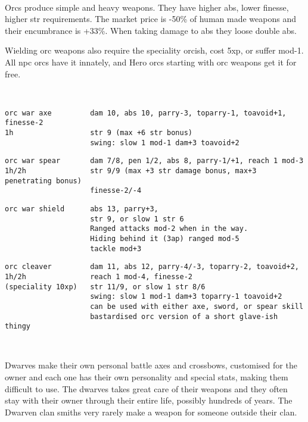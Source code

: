 \


\goodbreak
\noindent Orcs produce simple and heavy weapons. They have higher abs, lower finesse, higher str requirements. The market price is -50\% of human made weapons and their encumbrance is +33\%. When taking damage to abs they loose double abs.

Wielding orc weapons also require the speciality orcish, cost 5xp, or suffer mod-1.
All npc orcs have it innately, and Hero orcs starting with orc weapons get it for free.

\

\small \begin{samepage} \begin{verbatim}
orc war axe         dam 10, abs 10, parry-3, toparry-1, toavoid+1, finesse-2
1h                  str 9 (max +6 str bonus)
                    swing: slow 1 mod-1 dam+3 toavoid+2
\end{verbatim} \blocklistgap \begin{verbatim}
orc war spear       dam 7/8, pen 1/2, abs 8, parry-1/+1, reach 1 mod-3
1h/2h               str 9/9 (max +3 str damage bonus, max+3 penetrating bonus)
                    finesse-2/-4
\end{verbatim} \blocklistgap \begin{verbatim}
orc war shield      abs 13, parry+3,
                    str 9, or slow 1 str 6
                    Ranged attacks mod-2 when in the way.
                    Hiding behind it (3ap) ranged mod-5
                    tackle mod+3
\end{verbatim} \blocklistgap \begin{verbatim}
orc cleaver         dam 11, abs 12, parry-4/-3, toparry-2, toavoid+2,
1h/2h               reach 1 mod-4, finesse-2
(speciality 10xp)   str 11/9, or slow 1 str 8/6
                    swing: slow 1 mod-1 dam+3 toparry-1 toavoid+2
                    can be used with either axe, sword, or spear skill
                    bastardised orc version of a short glave-ish thingy
\end{verbatim} \end{samepage} \normalsize \goodbreak

\


\goodbreak
\noindent Dwarves make their own personal battle axes and crossbows, customised for the owner and each one has their own personality and special stats, making them difficult to use. The dwarves takes great care of their weapons and they often stay with their owner through their entire life, possibly hundreds of years. The Dwarven clan smiths very rarely make a weapon for someone outside their clan.

